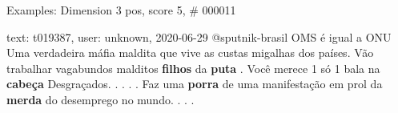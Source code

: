 \begin{frame}{Examples: Dimension 3 pos, score 5, \# 000011}
\footnotesize
\begin{exampleblock}{text: t019387, user: unknown, 2020-06-29}
@sputnik-brasil OMS é igual a ONU Uma verdadeira máfia maldita que vive as 
custas migalhas dos países. Vão trabalhar vagabundos malditos \textbf{filhos} 
da \textbf{puta} . Você merece 1 só 1 bala na \textbf{cabeça} Desgraçados. . . 
. . Faz uma \textbf{porra} de uma manifestação em prol da \textbf{merda} do 
desemprego no mundo. . . . 
\end{exampleblock}
\end{frame}
